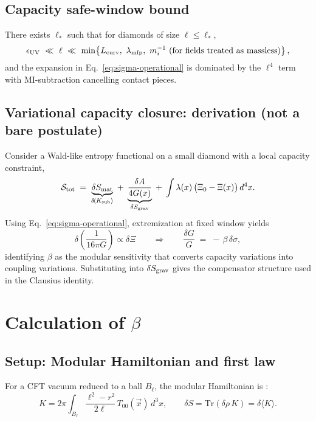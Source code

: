 \documentclass[aps,prd,onecolumn,superscriptaddress,nofootinbib]{revtex4-2}
\begin{document}
\subsection{Capacity safe-window bound}
\label{sec:safe-window}
There exists \(\ell_\ast\) such that for diamonds of size \(\ell\le \ell_\ast\),
\begin{equation}
\epsilon_{\rm UV}\ \ll\ \ell\ \ll\ \min\!\left\{L_{\rm curv},\ \lambda_{\rm mfp},\ m_{i}^{-1}\ \text{(for fields treated as massless)}\right\},
\end{equation}
and the expansion in Eq.~\eqref{eq:sigma-operational} is dominated by the \(\ell^4\) term with MI-subtraction cancelling contact pieces.

\subsection{Variational capacity closure: derivation (not a bare postulate)}
\label{sec:variational-closure}
Consider a Wald-like entropy functional on a small diamond with a local capacity constraint,
\begin{equation}
\mathcal{S}_{\rm tot} \;=\; \underbrace{\delta S_{\rm mat}}_{\delta\!\langle K_{\rm sub}\rangle} \;+\; \underbrace{\frac{\delta A}{4G(x)}}_{\delta S_{\rm grav}} \;+\; \int \lambda(x)\,\big(\Xi_0-\Xi(x)\big)\,d^4x.
\end{equation}
Using Eq.~\eqref{eq:sigma-operational}, extremization at fixed window yields
\begin{equation}
\delta\!\left(\frac{1}{16\pi G}\right) \propto \delta \Xi
\qquad\Rightarrow\qquad
\frac{\delta G}{G} \;=\; -\,\beta\,\delta \sigma,
\end{equation}
identifying \(\beta\) as the modular sensitivity that converts capacity variations into coupling variations. Substituting into \(\delta S_{\rm grav}\) gives the compensator structure used in the Clausius identity.

\section{Calculation of \texorpdfstring{$\beta$}{beta}}
\label{sec:beta-calc}

\subsection{Setup: Modular Hamiltonian and first law}
For a CFT vacuum reduced to a ball \(B_\ell\), the modular Hamiltonian is \cite{Casini2011}:
\begin{equation}
K = 2\pi \int_{B_\ell} \frac{\ell^2 - r^2}{2\ell} \, T_{00}(\vec{x}) \, d^3x, \qquad
\delta S = \mathrm{Tr}(\delta\rho\, K) = \delta \langle K \rangle.
\end{equation}
\end{document}
